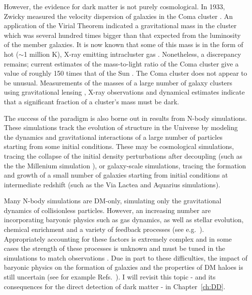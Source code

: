 However, the evidence for dark matter is not purely cosmological. In 1933, Zwicky measured the velocity dispersion of galaxies in the Coma cluster \cite{Zwicky:1933}. An application of the Virial Theorem indicated a gravitational mass in the cluster which was several hundred times bigger than that expected from the luminosity of the member galaxies. It is now known that some of this mass is in the form of hot ($\sim$1 million K), X-ray emitting intracluster gas \cite{Sanders:2013}. Nonetheless, a discrepancy remains; current estimates of the mass-to-light ratio of the Coma cluster give a value of roughly 150 times that of the Sun \cite{Fusco-Femiano:1994,Makino:1994}. The Coma cluster does not appear to be unusual. Measurements of the masses of a large number of galaxy clusters using gravitational lensing \cite{Okabe:2013}, X-ray observations \cite{Ettori:2013} and dynamical estimates \cite{Carlberg:1995} indicate that a significant fraction of a cluster's mass must be dark.

The success of the \LCDM paradigm is also borne out in results from N-body simulations. These simulations track the evolution of structure in the Universe by modeling the dynamics and gravitational interactions of a large number of particles starting from some initial conditions. These may be cosmological simulations, tracing the collapse of the initial density perturbations after decoupling (such as the the Millenium simulation \cite{Springel:2005}), or galaxy-scale simulations, tracing the formation and growth of a small number of galaxies starting from initial conditions at intermediate redshift (such as the Via Lactea \cite{Diemand:2006} and Aquarius \cite{Springel:2008} simulations).

Many N-body simulations are DM-only, simulating only the gravitational dynamics of collisionless particles. However, an increasing number are incorporating baryonic physics such as gas dynamics, as well as stellar evolution, chemical enrichment and a variety of feedback processes (see e.g.~\cite{Mollitor:2014,Vogelsberger:2014}). Appropriately accounting for these factors is extremely complex and in some cases the strength of these processes is unknown and must be tuned in the simulations to match observations \cite{Vogelsberger:2013}. Due in part to these difficulties, the impact of baryonic physics on the formation of galaxies and the properties of DM haloes is still uncertain (see for example Refs.~\cite{Martizzi:2012,Pillepich:2014}). I will revisit this topic - and its consequences for the direct detection of dark matter - in Chapter~\ref{ch:DD}.

